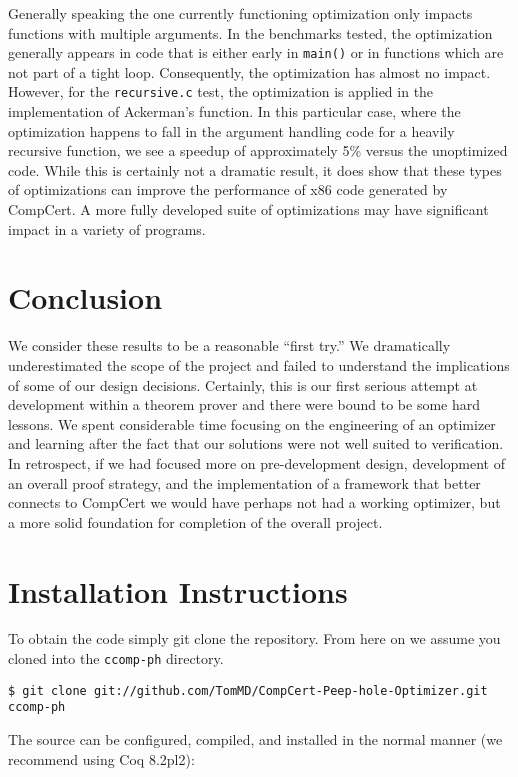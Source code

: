 \documentclass{article}
\begin{document}
Generally speaking the one currently functioning optimization only
impacts functions with multiple arguments. In the benchmarks tested,
the optimization generally appears in code that is either early in
{\tt main()} or in functions which are not part of a tight
loop. Consequently, the optimization has almost no impact. However,
for the {\tt recursive.c} test, the optimization is applied in the
implementation of Ackerman's function. In this particular case, where
the optimization happens to fall in the argument handling code for a
heavily recursive function, we see a speedup of approximately 5\%
versus the unoptimized code. While this is certainly not a dramatic
result, it does show that these types of optimizations can improve the
performance of x86 code generated by CompCert. A more fully developed
suite of optimizations may have significant impact in a variety of
programs.

\section{Conclusion}

We consider these results to be a reasonable ``first try.'' We
dramatically underestimated the scope of the project and failed to
understand the implications of some of our design
decisions. Certainly, this is our first serious attempt at development
within a theorem prover and there were bound to be some hard
lessons. We spent considerable time focusing on the engineering of an
optimizer and learning after the fact that our solutions were not well
suited to verification. In retrospect, if we had focused more on
pre-development design, development of an overall proof strategy, and
the implementation of a framework that better connects to CompCert we
would have perhaps not had a working optimizer, but a more solid
foundation for completion of the overall project.

\clearpage
\appendix
\section{Installation Instructions}
To obtain the code simply git clone the repository.  From here on we
assume you cloned into the {\tt ccomp-ph} directory.

\begin{verbatim}
$ git clone git://github.com/TomMD/CompCert-Peep-hole-Optimizer.git ccomp-ph
\end{verbatim}

The source can be configured, compiled, and installed in the normal
manner (we recommend using Coq 8.2pl2):
\end{document}
